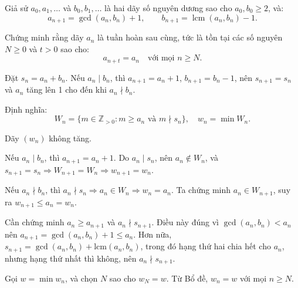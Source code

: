 \ifshowproblemandsoln
\ifshowproblem\begin{problem}\label{problem:IMO-2015-SL-P4}\fi
\ifshowsoln\begin{problem}\fi
    Giả sử \( a_0, a_1, \ldots \) và \( b_0, b_1, \ldots \) là hai dãy số nguyên dương sao cho \( a_0, b_0 \ge 2 \), và:
    \[
        a_{n+1} = \gcd(a_n, b_n) + 1, \qquad b_{n+1} = \operatorname{lcm}(a_n, b_n) - 1.
    \]

    Chứng minh rằng dãy \( a_n \) là tuần hoàn sau cùng, tức là tồn tại các số nguyên \( N \ge 0 \) và \( t > 0 \) sao cho:
    \[
        a_{n+t} = a_n \quad \text{với mọi } n \ge N.
    \]
\end{problem}
\fi

\ifshowsoln
\begin{soln}\footnotemark
    Đặt \( s_n = a_n + b_n \). Nếu \( a_n \mid b_n \), thì \( a_{n+1} = a_n + 1 \), \( b_{n+1} = b_n - 1 \),
    nên \( s_{n+1} = s_n \) và \( a_n \) tăng lên 1 cho đến khi \( a_n \nmid b_n \).

    Định nghĩa:
    \[
        W_n = \{ m \in \mathbb{Z}_{>0} : m \ge a_n \text{ và } m \nmid s_n \}, \quad w_n = \min W_n.
    \]

    \begin{claim*}
        Dãy \( (w_n) \) không tăng.
    \end{claim*}

    \begin{subproof}
        Nếu \( a_n \mid b_n \), thì \( a_{n+1} = a_n + 1 \). Do \( a_n \mid s_n \), nên \( a_n \notin W_n \), và \( s_{n+1} = s_n \Rightarrow W_{n+1} = W_n \Rightarrow w_{n+1} = w_n \).

        Nếu \( a_n \nmid b_n \), thì \( a_n \nmid s_n \Rightarrow a_n \in W_n \Rightarrow w_n = a_n \). Ta chứng minh \( a_n \in W_{n+1} \), suy ra \( w_{n+1} \le a_n = w_n \).

        Cần chứng minh \( a_n \ge a_{n+1} \) và \( a_n \nmid s_{n+1} \). Điều này đúng vì \( \gcd(a_n, b_n) < a_n \) nên \( a_{n+1} = \gcd(a_n, b_n) + 1 \le a_n \). Hơn nữa, \( s_{n+1} = \gcd(a_n, b_n) + \text{lcm}(a_n, b_n) \), trong đó hạng thứ hai chia hết cho \( a_n \), nhưng hạng thứ nhất thì không, nên \( a_n \nmid s_{n+1} \).
    \end{subproof}

    Gọi \( w = \min w_n \), và chọn \( N \) sao cho \( w_N = w \). Từ Bổ đề, \( w_n = w \) với mọi \( n \ge N \).


\end{soln}
\end{problem}
